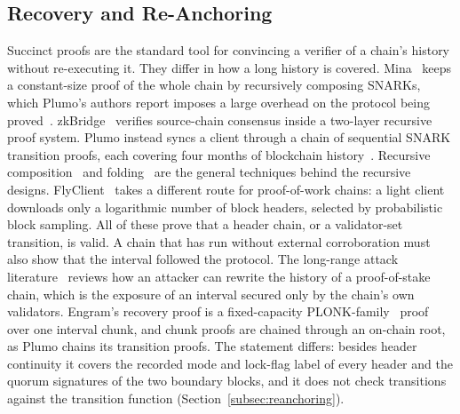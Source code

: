 \subsection{Recovery and Re-Anchoring}
\label{subsec:rw-recovery}
Succinct proofs are the standard tool for convincing a verifier of a chain's
history without re-executing it. They differ in how a long history is covered.
Mina~\cite{bonneau2020mina} keeps a constant-size proof of the whole chain by
recursively composing SNARKs, which Plumo's authors report imposes a large
overhead on the protocol being proved~\cite{vesely2022plumo}. zkBridge~\cite{xie2022zkbridge}
verifies source-chain consensus inside a two-layer recursive proof system.
Plumo instead syncs a client through a chain of sequential SNARK transition
proofs, each covering four months of blockchain history~\cite{vesely2022plumo}.
Recursive composition~\cite{bitansky2013recursive,bowe2019halo} and
folding~\cite{kothapalli2022nova} are the general techniques behind the
recursive designs. FlyClient~\cite{bunz2020flyclient} takes a different route
for proof-of-work chains: a light client downloads only a logarithmic number of
block headers, selected by probabilistic block sampling.
All of these prove that a header chain, or a validator-set transition, is
valid. A chain that has run without external corroboration must also show that
the interval followed the protocol. The long-range attack
literature~\cite{deirmentzoglou2019longrange} reviews how an attacker can
rewrite the history of a proof-of-stake chain, which is the exposure of an
interval secured only by the chain's own validators. Engram's recovery proof is
a fixed-capacity PLONK-family~\cite{gabizon2019plonk} proof over one interval
chunk, and chunk proofs are chained through an on-chain root, as Plumo chains
its transition proofs. The statement differs: besides header continuity it covers
the recorded mode and lock-flag label of every header and the quorum signatures
of the two boundary blocks, and it does not check transitions against the
transition function (Section~\ref{subsec:reanchoring}).

